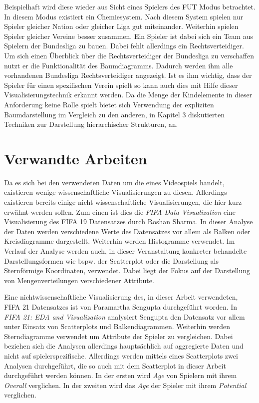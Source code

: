 \documentclass[usegeometry=true]{scrartcl}
\begin{document}
Beispielhaft wird diese wieder aus Sicht eines Spielers des FUT Modus betrachtet. In diesem Modus existiert ein Chemiesystem\cite{heib_fifa_2021}. Nach diesem System spielen nur Spieler gleicher Nation oder gleicher Liga gut miteinander. Weiterhin spielen Spieler gleicher Vereine besser zusammen. Ein Spieler ist dabei sich ein Team aus Spielern der Bundesliga zu bauen. Dabei fehlt allerdings ein Rechtsverteidiger. Um sich einen Überblick über die Rechtsverteidiger der Bundesliga zu verschaffen nutzt er die Funktionalität des Baumdiagramms. Dadurch werden ihm alle vorhandenen Bundesliga Rechtsverteidiger angezeigt. Ist es ihm wichtig, dass der Spieler für einen spezifischen Verein spielt so kann auch dies mit Hilfe dieser Visualisierungstechnik erkannt werden. Da die Menge der Kindelemente in dieser Anforderung keine Rolle spielt bietet sich Verwendung der expliziten Baumdarstellung im Vergleich zu den anderen, in Kapitel 3 diskutierten Techniken zur Darstellung hierarchischer Strukturen, an.



\section{Verwandte Arbeiten}

Da es sich bei den verwendeten Daten um die eines Videospiels handelt, existieren wenige wissenschaftliche Visualisierungen zu diesen. Allerdings existieren bereits einige nicht wissenschaftliche Visualisierungen, die hier kurz erwähnt werden sollen.
Zum einen ist dies die \textit{FIFA Data Visualization}\cite{ roshan_fifa_nodate} eine Visualisierung des FIFA 19 Datensatzes durch Roshan Sharma. In dieser Analyse der Daten werden verschiedene Werte des Datensatzes vor allem als Balken oder Kreisdiagramme dargestellt. Weiterhin werden Histogramme verwendet. Im Verlauf der Analyse werden auch, in dieser Veranstaltung konkreter behandelte Darstellungsformen wie bspw. der Scatterplot oder die Darstellung als Sternförmige Koordinaten, verwendet. Dabei liegt der Fokus auf der Darstellung von Mengenverteilungen verschiedener Attribute.

Eine nichtwissenschaftliche Visualisierung des, in dieser Arbeit verwendeten, FIFA 21 Datensatzes ist von Paramartha Sengupta durchgeführt worden. In \textit{FIFA 21: EDA and Visualization}\cite{sengupta_fifa_nodate} analysiert Sengupta  den Datensatz vor allem unter Einsatz von Scatterplots und Balkendiagrammen. Weiterhin werden Sterndiagramme verwendet um Attribute der Spieler zu vergleichen. Dabei beziehen sich die Analysen allerdings hauptsächlich auf aggregierte Daten und nicht auf spielerspezifische.
Allerdings werden mittels eines Scatterplots zwei Analysen durchgeführt, die so auch mit dem Scatterplot in dieser Arbeit durchgeführt werden können. In der ersten wird \textit{Age} von Spielern mit ihrem \textit{Overall} verglichen. In der zweiten wird das \textit{Age} der Spieler mit ihrem \textit{Potential} verglichen.\\
\end{document}
